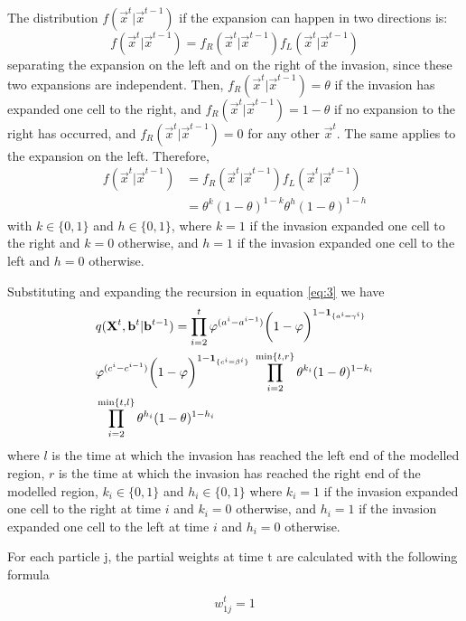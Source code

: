 The distribution $f(\vec{x}^{t} | \vec{x}^{t-1})$ if the expansion can happen in two directions is:
\begin{equation*}
    f(\vec{x}^{t} | \vec{x}^{t-1}) = f_R(\vec{x}^{t} | \vec{x}^{t-1}) f_L(\vec{x}^{t} | \vec{x}^{t-1}) 
\end{equation*}
separating the expansion on the left and on the right of the invasion, since
these two expansions are independent. Then, $f_R(\vec{x}^{t} | \vec{x}^{t-1}) = \theta$ if the invasion has expanded one cell to the right, and $f_R(\vec{x}^{t} | \vec{x}^{t-1}) = 1 - \theta$ if no expansion to the right has occurred, and $f_R(\vec{x}^{t} | \vec{x}^{t-1}) = 0$ for any other $\vec{x}^{t}$. The same applies to the expansion on the left. Therefore,
\begin{align*}
    f(\vec{x}^{t} | \vec{x}^{t-1}) &= f_R(\vec{x}^{t} | \vec{x}^{t-1}) f_L(\vec{x}^{t} | \vec{x}^{t-1})\\
    & = \theta^{k} (1-\theta)^{1-k}\theta^{h} (1-\theta)^{1-h} 
\end{align*}
with $k \in \{0,1\}$ and $h \in \{0,1\}$, where $k = 1$ if the invasion expanded one cell to the right and $k = 0$ otherwise, and $h = 1$ if the invasion expanded one cell to the left and $h = 0$ otherwise.

Substituting and expanding the recursion in equation \eqref{eq:3} we have
\begin{align}
    & q(\mathbf{X}^{t},\mathbf{b}^{t} | \mathbf{b}^{t-1}) =  \prod_{i=2}^{t} \varphi^{(a^{i} - a^{i-1})}\bigg(1 - \varphi \bigg)^{1-\mathbf{1}_{\{a^i=\gamma^i\}}} \nonumber \\
    & \varphi^{(c^{i} - c^{i-1})} \bigg(1 - \varphi\bigg)^{1-\mathbf{1}_{\{c^i=\beta^i\}}} \; \prod_{i=2}^{\min\{t,r\}} \theta^{k_i} (1-\theta)^{1-k_i}  \label{eq:4} \\ 
    & \prod_{i=2}^{\min\{t,l\}} \theta^{h_i} (1-\theta)^{1-h_i} \nonumber
\end{align}
where $l$ is the time at which the invasion has reached the left end of the modelled region, $r$ is the time at which the invasion has reached the right end of the modelled region, $k_i \in \{0,1\}$ and $h_i \in \{0,1\}$ where $k_i = 1$  if the invasion expanded one cell to the right at time $i$ and $k_i = 0$ otherwise, and $h_i = 1$ if the invasion expanded one cell to the left at time $i$ and $h_i = 0$ otherwise.

For each particle j, the partial weights at time t are calculated with the following formula

\begin{equation*}
    w_{1j}^t = 1
\end{equation*}

